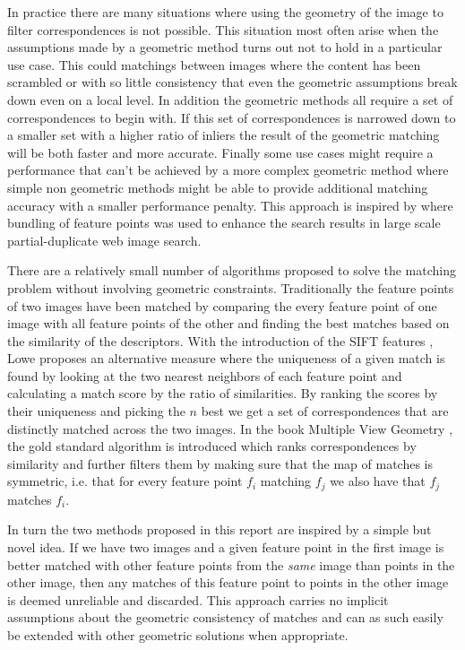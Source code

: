 \documentclass{article}
\begin{document}
In practice there are many situations where using the geometry of the 
image to filter correspondences is not possible. This situation most 
often arise when the assumptions made by a geometric method turns out 
not to hold in a particular use case. This could matchings between 
images where the content has been scrambled or with so little 
consistency that even the geometric assumptions break down even on a 
local level. In addition the geometric methods all require a set of 
correspondences to begin with. If this set of correspondences is 
narrowed down to a smaller set with a higher ratio of inliers the result 
of the geometric matching will be both faster and more accurate. Finally 
some use cases might require a performance that can't be achieved by a 
more complex geometric method where simple non geometric methods might 
be able to provide additional matching accuracy with a smaller 
performance penalty. This approach is inspired by \cite{wu2009bundling} 
where bundling of feature points was used to enhance the search results 
in large scale partial-duplicate web image search.

There are a relatively small number of algorithms proposed to solve the 
matching problem without involving geometric constraints. Traditionally 
the feature points of two images have been matched by comparing the 
every feature point of one image with all feature points of the other 
and finding the best matches based on the similarity of the descriptors.  
With the introduction of the SIFT features \cite{lowe2004sift}, Lowe 
proposes an alternative measure where the uniqueness of a given match is 
found by looking at the two nearest neighbors of each feature point and 
calculating a match score by the ratio of similarities. By ranking the 
scores by their uniqueness and picking the $n$ best we get a set of 
correspondences that are distinctly matched across the two images. In 
the book Multiple View Geometry \cite[p.  114]{multipleView}, the gold 
standard algorithm is introduced which ranks correspondences by 
similarity and further filters them by making sure that the map of 
matches is symmetric, i.e. that for every feature point $f_i$ matching 
$f_j$ we also have that $f_j$ matches $f_i$.

In turn the two methods proposed in this report are inspired by a simple 
but novel idea. If we have two images and a given feature point in the 
first image is better matched with other feature points from the 
\emph{same} image than points in the other image, then any matches of 
this feature point to points in the other image is deemed unreliable and 
discarded.  This approach carries no implicit assumptions about the 
geometric consistency of matches and can as such easily be extended with 
other geometric solutions when appropriate.
\end{document}
